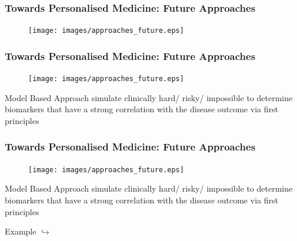 \documentclass{beamer}
\begin{document}
\begin{frame}
	\frametitle{Towards Personalised Medicine: Future Approaches}
	\begin{minipage}{0.59\textwidth}
		\begin{figure}[H]
			\texttt{[image: images/approaches\_future.eps]}
		\end{figure}
	\end{minipage} \hfill
	\begin{minipage}{0.39\textwidth}
	\end{minipage}
\end{frame}
\begin{frame}
	\frametitle{Towards Personalised Medicine: Future Approaches}
	\begin{minipage}{0.59\textwidth}
		\begin{figure}[H]
			\texttt{[image: images/approaches\_future.eps]}
		\end{figure}
	\end{minipage} \hfill
	\begin{minipage}{0.39\textwidth}
		\begin{block}{Model Based Approach}
			simulate clinically hard/ risky/ impossible to determine biomarkers that have a strong correlation with the disease outcome via first principles 
		\end{block}
	\end{minipage}
\end{frame}
\begin{frame}
	\frametitle{Towards Personalised Medicine: Future Approaches}
	\begin{minipage}{0.59\textwidth}
		\begin{figure}[H]
			\texttt{[image: images/approaches\_future.eps]}
		\end{figure}
	\end{minipage} \hfill
	\begin{minipage}{0.39\textwidth}
		\begin{block}{Model Based Approach}
			simulate clinically hard/ risky/ impossible to determine biomarkers that have a strong correlation with the disease outcome via first principles 
		\end{block}
		\begin{block}{Example}
			$\hookrightarrow$
		\end{block}
	\end{minipage}
\end{frame}
\end{document}
